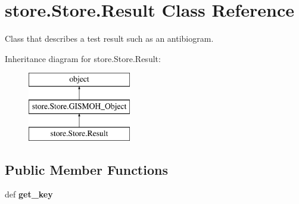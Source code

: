 \hypertarget{classstore_1_1_store_1_1_result}{\section{store.\-Store.\-Result Class Reference}
\label{classstore_1_1_store_1_1_result}
}


Class that describes a test result such as an antibiogram.  


Inheritance diagram for store.\-Store.\-Result\-:\begin{figure}[H]
\begin{center}
\leavevmode
\includegraphics[height=3.000000cm]{classstore_1_1_store_1_1_result}
\end{center}
\end{figure}
\subsection*{Public Member Functions}
\begin{DoxyCompactItemize}
\item 
\hypertarget{classstore_1_1_store_1_1_result_a6f0d5d1bc4a54bf6d2633f1e3b21e8bd}{def {\bfseries get\-\_\-key}}\label{classstore_1_1_store_1_1_result_a6f0d5d1bc4a54bf6d2633f1e3b21e8bd}

\end{DoxyCompactItemize}
